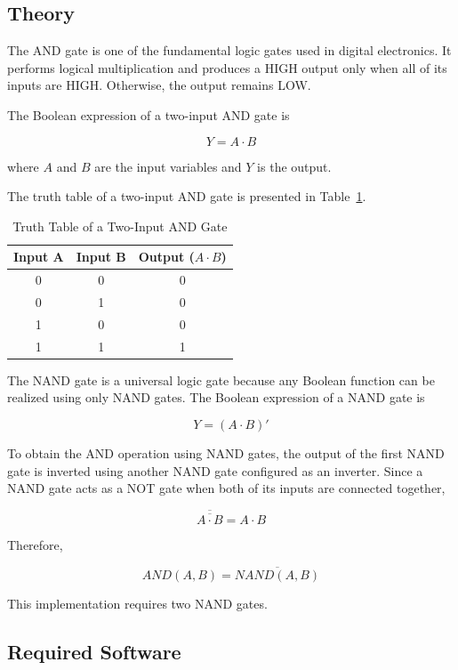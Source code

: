 \documentclass[12pt,a4paper]{article}
\begin{document}

\subsection{Theory}

The AND gate is one of the fundamental logic gates used in digital electronics. It performs logical multiplication and produces a HIGH output only when all of its inputs are HIGH. Otherwise, the output remains LOW.

The Boolean expression of a two-input AND gate is

\[
Y = A \cdot B
\]

where $A$ and $B$ are the input variables and $Y$ is the output.

The truth table of a two-input AND gate is presented in Table~\ref{tab:and_truth}.

\begin{table}[H]
\centering
\caption{Truth Table of a Two-Input AND Gate}
\label{tab:and_truth}
\begin{tabular}{|c|c|c|}
\hline
Input A & Input B & Output ($A \cdot B$)\\
\hline
0 & 0 & 0\\
\hline
0 & 1 & 0\\
\hline
1 & 0 & 0\\
\hline
1 & 1 & 1\\
\hline
\end{tabular}
\end{table}

The NAND gate is a universal logic gate because any Boolean function can be realized using only NAND gates. The Boolean expression of a NAND gate is

\[
Y=(A \cdot B)'
\]

To obtain the AND operation using NAND gates, the output of the first NAND gate is inverted using another NAND gate configured as an inverter. Since a NAND gate acts as a NOT gate when both of its inputs are connected together,

\[
\overline{\overline{A \cdot B}} = A \cdot B
\]

Therefore,

\[
AND(A,B)=\overline{NAND(A,B)}
\]

This implementation requires two NAND gates.


\subsection{Required Software}
\end{document}
